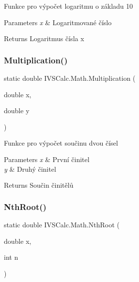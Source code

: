 Funkce pro výpočet logaritmu o základu 10 


\begin{DoxyParams}{Parameters}
{\em x} & Logaritmované číslo\\
\hline
\end{DoxyParams}
\begin{DoxyReturn}{Returns}
Logaritmus čísla x
\end{DoxyReturn}
\mbox{\label{class_i_v_s_calc_1_1_math_abe981553a5b5e2e2d90ce6e4cf90fde0}} 
\subsubsection{\texorpdfstring{Multiplication()}{Multiplication()}}
{\footnotesize\ttfamily static double I\+V\+S\+Calc.\+Math.\+Multiplication (\begin{DoxyParamCaption}\item[{double}]{x,  }\item[{double}]{y }\end{DoxyParamCaption})\hspace{0.3cm}{\ttfamily [static]}}



Funkce pro výpočet součinu dvou čísel 


\begin{DoxyParams}{Parameters}
{\em x} & První činitel\\
\hline
{\em y} & Druhý činitel\\
\hline
\end{DoxyParams}
\begin{DoxyReturn}{Returns}
Součin činitělů
\end{DoxyReturn}
\mbox{\label{class_i_v_s_calc_1_1_math_a514b9abce73be4d00096aff1050a49b0}} 
\subsubsection{\texorpdfstring{Nth\+Root()}{NthRoot()}}
{\footnotesize\ttfamily static double I\+V\+S\+Calc.\+Math.\+Nth\+Root (\begin{DoxyParamCaption}\item[{double}]{x,  }\item[{int}]{n }\end{DoxyParamCaption})\hspace{0.3cm}{\ttfamily [static]}}



